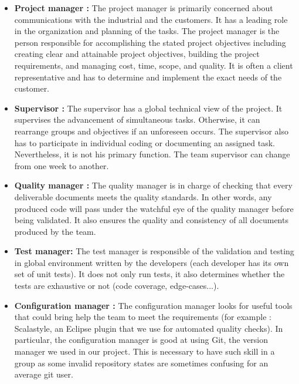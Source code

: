 \documentclass{report}
\begin{document}
\vspace{1.5mm}
\begin{itemize}
\item \textbf{Project manager :} The project manager is primarily concerned
 about communications with the industrial and the customers.
 It has a leading role in the organization and planning of the 
tasks. The project manager is the person responsible for 
accomplishing the stated project objectives including creating
clear and attainable project objectives, building the project 
requirements, and managing cost, time, scope, and quality.
 It is often a client representative and has to determine and 
implement the exact needs of the customer.\vspace{1mm}
\item \textbf{Supervisor :} The supervisor has a global technical view of the project.
 It supervises the advancement of simultaneous tasks.
 Otherwise, it can rearrange groups and objectives if an 
unforeseen occurs. The supervisor also has to participate in individual coding
 or documenting an assigned task. Nevertheless, it is not his
 primary function. The team supervisor can change from one week 
to another.\vspace{1mm}
\item \textbf{Quality manager :} The quality manager is in charge of checking that
 every deliverable documents meets the quality standards. In other 
words, any produced code will pass under the watchful eye of the 
quality manager before being validated. It also ensures the quality 
and consistency of all documents produced by the team.\vspace{1mm}
\item \textbf{Test manager:} The test manager is responsible of the validation
 and testing in global environment written by the developers 
(each developer has its own set of unit tests). It does not only 
run tests, it also determines whether the tests are exhaustive or 
not (code coverage, edge-cases...).\vspace{1mm}
\item \textbf{Configuration manager :} The configuration manager looks for useful tools that could
bring help the team to meet the requirements (for example : Scalastyle, an 
Eclipse plugin that we use for automated quality checks). In particular, the configuration manager is good at
using Git, the version manager we used in our project. This is necessary to have such skill in a group as some
invalid repository states are sometimes confusing for an average git user.\vspace{1mm}
\end{itemize}
\end{document}
